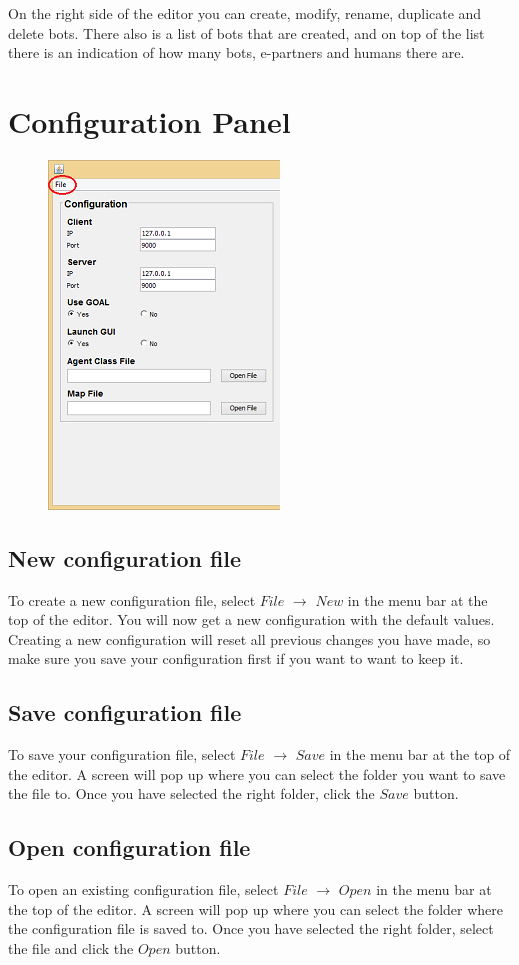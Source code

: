 \documentclass[a4paper]{article}
\begin{document}
On the right side of the editor you can create, modify, rename, duplicate and delete bots. There also is a list of bots that are created, and on top of the list there is an indication of how many bots, e-partners and humans there are.
\pagebreak
\section{Configuration Panel}
\begin{figure}
\includegraphics{config.png}
\end{figure}
\subsection{New configuration file}
To create a new configuration file, select $File$ $\to$ $New$ in the menu bar at the top of the editor. You will now get a new configuration with the default values. Creating a new configuration will reset all previous changes you have made, so make sure you save your configuration first if you want to want to keep it.

\subsection{Save configuration file}
To save your configuration file, select $File$ $\to$ $Save$ in the menu bar at the top of the editor. A screen will pop up where you can select the folder you want to save the file to. Once you have selected the right folder, click the $Save$ button.

\subsection{Open configuration file}
To open an existing configuration file, select $File$ $\to$ $Open$ in the menu bar at the top of the editor. A screen will pop up where you can select the folder where the configuration file is saved to. Once you have selected the right folder, select the file and click the $Open$ button.
\pagebreak
\end{document}
